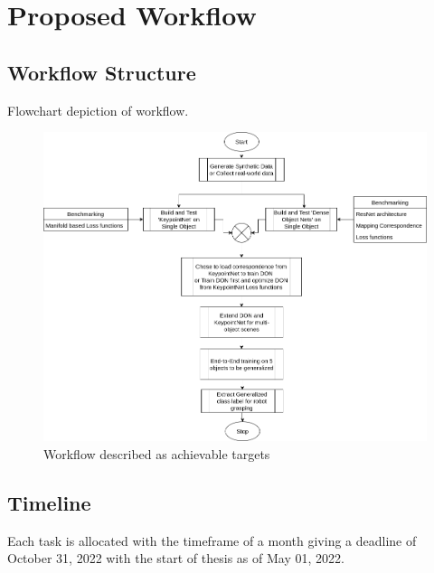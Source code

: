 \chapter{Proposed Workflow}


\section{Workflow Structure}

Flowchart depiction of workflow.

\begin{figure}[h]
    \centering

    \caption{Workflow described as achievable targets}
    \includegraphics[scale=0.4]{images/workflow.png}

\end{figure}

\section{Timeline}

Each task is allocated with the timeframe of a month giving a deadline of October 31, 2022 with the start of thesis as of May 01, 2022.